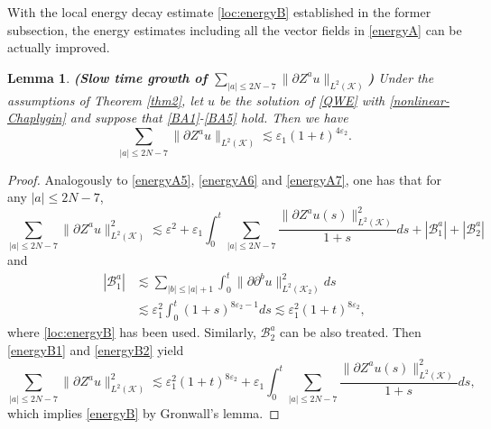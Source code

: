 \documentclass[11pt,twoside]{article}
\def\cB{\mathcal B}
\def\cK{\mathcal K}
\def\ds{\displaystyle}
\def\p{\partial}
\def\ve{\varepsilon}
\def\ls{\lesssim}
\theoremstyle{plain}
\newtheorem{lemma}[theorem]{Lemma}
\theoremstyle{definition}
\numberwithin{equation}{section}
\begin{document}
With the local energy decay estimate \eqref{loc:energyB} established in the former subsection,
the energy estimates including all the vector fields in \eqref{energyA} can be actually improved.
\begin{lemma}
{\bf (Slow time growth of $\ds\sum_{|a|\le2N-7}\|\p Z^au\|_{L^2(\cK)}$)}
Under the assumptions of Theorem \ref{thm2}, let $u$ be the solution of \eqref{QWE} with \eqref{nonlinear-Chaplygin}
and suppose that \eqref{BA1}-\eqref{BA5} hold.
Then we have
\begin{equation}\label{energyB}
\sum_{|a|\le2N-7}\|\p Z^au\|_{L^2(\cK)}\ls\ve_1(1+t)^{4\ve_2}.
\end{equation}
\end{lemma}
\begin{proof}
Analogously to \eqref{energyA5}, \eqref{energyA6} and \eqref{energyA7}, one has that for any $|a|\le2N-7$,
\begin{equation}\label{energyB1}
\sum_{|a|\le2N-7}\|\p Z^au\|^2_{L^2(\cK)}\ls\ve^2+\ve_1\int_0^t\sum_{|a|\le2N-7}\frac{\|\p Z^au(s)\|^2_{L^2(\cK)}}{1+s}ds
+|\cB^a_1|+|\cB^a_2|
\end{equation}
and
\begin{equation}\label{energyB2}
\begin{split}
|\cB^a_1|&\ls\sum_{|b|\le|a|+1}\int_0^t\|\p \p^bu\|^2_{L^2(\cK_2)}ds\\
&\ls\ve_1^2\int_0^t(1+s)^{8\ve_2-1}ds\ls\ve_1^2(1+t)^{8\ve_2},
\end{split}
\end{equation}
where \eqref{loc:energyB} has been used. Similarly, $\cB^a_2$ can be also treated.
Then \eqref{energyB1} and \eqref{energyB2} yield
\begin{equation*}
\sum_{|a|\le2N-7}\|\p Z^au\|^2_{L^2(\cK)}\ls\ve_1^2(1+t)^{8\ve_2}+\ve_1\int_0^t\sum_{|a|\le2N-7}\frac{\|\p Z^au(s)\|^2_{L^2(\cK)}}{1+s}ds,
\end{equation*}
which implies \eqref{energyB} by Gronwall's lemma.
\end{proof}
\end{document}
